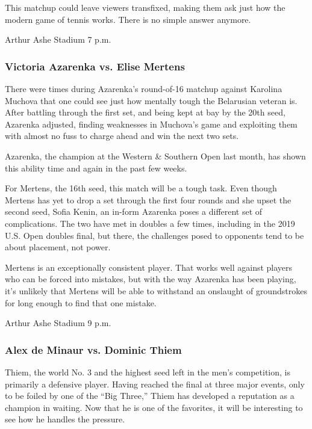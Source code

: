 This matchup could leave viewers transfixed, making them ask just how
the modern game of tennis works. There is no simple answer anymore.

Arthur Ashe Stadium \textbar{} 7 p.m.

\hypertarget{victoria-azarenka-vs-elise-mertens}{%
\subsubsection{\texorpdfstring{\textbf{Victoria Azarenka vs. Elise
Mertens}}{Victoria Azarenka vs. Elise Mertens}}\label{victoria-azarenka-vs-elise-mertens}}

There were times during Azarenka's round-of-16 matchup against Karolina
Muchova that one could see just how mentally tough the Belarusian
veteran is. After battling through the first set, and being kept at bay
by the 20th seed, Azarenka adjusted, finding weaknesses in Muchova's
game and exploiting them with almost no fuss to charge ahead and win the
next two sets.

Azarenka, the champion at the Western \& Southern Open last month, has
shown this ability time and again in the past few weeks.

For Mertens, the 16th seed, this match will be a tough task. Even though
Mertens has yet to drop a set through the first four rounds and she
upset the second seed, Sofia Kenin, an in-form Azarenka poses a
different set of complications. The two have met in doubles a few times,
including in the 2019 U.S. Open doubles final, but there, the challenges
posed to opponents tend to be about placement, not power.

Mertens is an exceptionally consistent player. That works well against
players who can be forced into mistakes, but with the way Azarenka has
been playing, it's unlikely that Mertens will be able to withstand an
onslaught of groundstrokes for long enough to find that one mistake.

Arthur Ashe Stadium \textbar{} 9 p.m.

\hypertarget{alex-de-minaur-vs-dominic-thiem}{%
\subsubsection{\texorpdfstring{\textbf{Alex de Minaur vs. Dominic
Thiem}}{Alex de Minaur vs. Dominic Thiem}}\label{alex-de-minaur-vs-dominic-thiem}}

Thiem, the world No. 3 and the highest seed left in the men's
competition, is primarily a defensive player. Having reached the final
at three major events, only to be foiled by one of the ``Big Three,''
Thiem has developed a reputation as a champion in waiting. Now that he
is one of the favorites, it will be interesting to see how he handles
the pressure.


